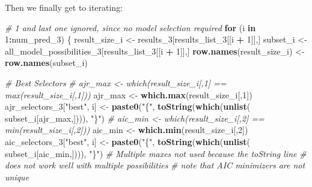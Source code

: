 \documentclass[
]{article}
\newenvironment{Shaded}{\begin{snugshade}}{\end{snugshade}}
\newcommand{\CommentTok}[1]{\textcolor[rgb]{0.56,0.35,0.01}{\textit{#1}}}
\newcommand{\ControlFlowTok}[1]{\textcolor[rgb]{0.13,0.29,0.53}{\textbf{#1}}}
\newcommand{\DecValTok}[1]{\textcolor[rgb]{0.00,0.00,0.81}{#1}}
\newcommand{\KeywordTok}[1]{\textcolor[rgb]{0.13,0.29,0.53}{\textbf{#1}}}
\newcommand{\NormalTok}[1]{#1}
\newcommand{\OperatorTok}[1]{\textcolor[rgb]{0.81,0.36,0.00}{\textbf{#1}}}
\newcommand{\StringTok}[1]{\textcolor[rgb]{0.31,0.60,0.02}{#1}}
\begin{document}

Then we finally get to iterating:

\begin{Shaded}
\begin{Highlighting}[]
\CommentTok{# 1 and last one ignored, since no model selection required}
\ControlFlowTok{for}\NormalTok{ (i }\ControlFlowTok{in} \DecValTok{1}\OperatorTok{:}\NormalTok{num_pred_}\DecValTok{3}\NormalTok{) \{}
\NormalTok{  result_size_i <-}\StringTok{ }\NormalTok{results_}\DecValTok{3}\NormalTok{[results_list_}\DecValTok{3}\NormalTok{[[i }\OperatorTok{+}\StringTok{ }\DecValTok{1}\NormalTok{]],]}
\NormalTok{  subset_i <-}\StringTok{ }\NormalTok{all_model_possibilities_}\DecValTok{3}\NormalTok{[results_list_}\DecValTok{3}\NormalTok{[[i }\OperatorTok{+}\StringTok{ }\DecValTok{1}\NormalTok{]],]}
  \KeywordTok{row.names}\NormalTok{(result_size_i) <-}\StringTok{ }\KeywordTok{row.names}\NormalTok{(subset_i)}

  \CommentTok{# Best Selectors}
  \CommentTok{# ajr_max <- which(result_size_i[,1] == max(result_size_i[,1]))}
\NormalTok{  ajr_max <-}\StringTok{ }\KeywordTok{which.max}\NormalTok{(result_size_i[,}\DecValTok{1}\NormalTok{])}
\NormalTok{  ajr_selectors_}\DecValTok{3}\NormalTok{[}\StringTok{"best"}\NormalTok{, i] <-}\StringTok{ }\KeywordTok{paste0}\NormalTok{(}\StringTok{"\{"}\NormalTok{,}
                                      \KeywordTok{toString}\NormalTok{(}\KeywordTok{which}\NormalTok{(}\KeywordTok{unlist}\NormalTok{(}
\NormalTok{                                        subset_i[ajr_max,]))),}
                                      \StringTok{"\}"}\NormalTok{)}
  \CommentTok{# aic_min <- which(result_size_i[,2] == min(result_size_i[,2]))}
\NormalTok{  aic_min <-}\StringTok{ }\KeywordTok{which.min}\NormalTok{(result_size_i[,}\DecValTok{2}\NormalTok{])}
\NormalTok{  aic_selectors_}\DecValTok{3}\NormalTok{[}\StringTok{"best"}\NormalTok{, i] <-}\StringTok{ }\KeywordTok{paste0}\NormalTok{(}\StringTok{"\{"}\NormalTok{,}
                                     \KeywordTok{toString}\NormalTok{(}\KeywordTok{which}\NormalTok{(}\KeywordTok{unlist}\NormalTok{(}
\NormalTok{                                       subset_i[aic_min,]))),}
                                     \StringTok{"\}"}\NormalTok{)}
  \CommentTok{# Multiple maxes not used because the toString line}
  \CommentTok{# does not work well with multiple possibilities}
  \CommentTok{# note that AIC minimizers are not unique}
  

\end{Highlighting}
\end{Shaded}
\end{document}
